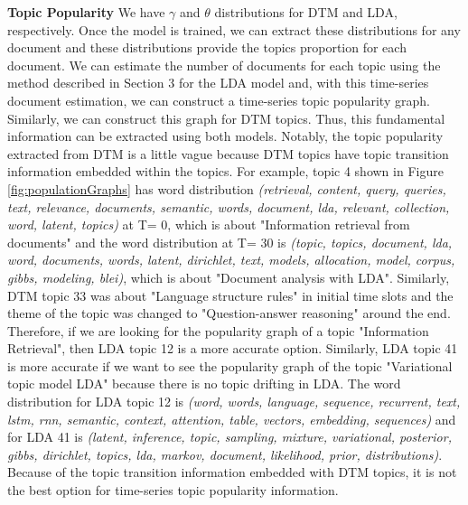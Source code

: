 \textbf{Topic Popularity} We have $\gamma$ and $\theta$ distributions for DTM and LDA, respectively. Once the model is trained, we can extract these distributions for any document and these distributions provide the topics proportion for each document. We can estimate the number of documents for each topic using the method described in Section 3 for the LDA model and, with this time-series document estimation, we can construct a time-series topic popularity graph. Similarly, we can construct this graph for DTM topics. Thus, this fundamental information can be extracted using both models. Notably, the topic popularity extracted from DTM is a little vague because DTM topics have topic transition information embedded within the topics. For example, topic 4 shown in Figure \ref{fig:populationGraphs} has word distribution \textit{(retrieval, content, query, queries, text, relevance, documents, semantic, words, document, lda, relevant, collection, word, latent, topics)} at T= 0, which is about "Information retrieval from documents" and the word distribution at T= 30 is \textit{(topic, topics, document, lda, word, documents, words, latent, dirichlet, text, models, allocation, model, corpus, gibbs, modeling, blei)}, which is about "Document analysis with LDA". Similarly, DTM topic 33 was about "Language structure rules" in initial time slots and the theme of the topic was changed to "Question-answer reasoning" around the end. Therefore, if we are looking for the popularity graph of a topic "Information Retrieval", then LDA topic 12 is a more accurate option. Similarly, LDA topic 41 is more accurate if we want to see the popularity graph of the topic "Variational topic model LDA" because there is no topic drifting in LDA. The word distribution for LDA topic 12 is \textit{(word, words, language, sequence, recurrent, text, lstm, rnn, semantic, context, attention, table, vectors, embedding, sequences)} and for LDA 41 is \textit{(latent, inference, topic, sampling, mixture, variational, posterior, gibbs, dirichlet, topics, lda, markov, document, likelihood, prior, distributions)}. Because of the topic transition information embedded with DTM topics, it is not the best option for time-series topic popularity information.
